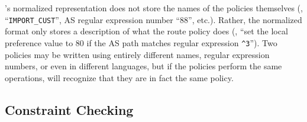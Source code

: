 \rccns's normalized representation does not store
the names of the policies themselves (\eg, ``{\tt IMPORT\_CUST}'', AS
regular expression number ``88'', etc.).  Rather, the normalized format
only stores a description of what the route policy does (\eg, ``set the
local preference value to $80$ if the AS path matches regular expression
{\tt \^{}3}'').  Two policies may be written using entirely different
names, regular expression numbers, or even in different languages, but
if the policies perform the same operations, \rcc will recognize that
they are in fact the same policy.








\subsection{Constraint Checking}\label{sec:verifier}

